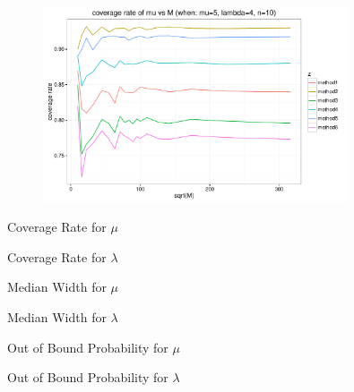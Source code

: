 \documentclass[12pt]{article}
\begin{document}
\begin{figure}[h] 
\includegraphics[width=0.8\textwidth]{findM3.pdf}
\caption{}
\end{figure}


\begin{table}[h]
\caption{Coverage Rate for $\mu$}
\end{table}

\begin{table}[h]
\caption{Coverage Rate for $\lambda$}
\end{table}

\begin{table}[h]
\caption{Median Width for $\mu$}
\end{table}

\begin{table}[h]
\caption{Median Width for $\lambda$}
\end{table}

\begin{table}[h]
\caption{Out of Bound Probability for $\mu$}
\end{table}

\begin{table}[h]
\caption{Out of Bound Probability for $\lambda$}
\end{table}
\end{document}
